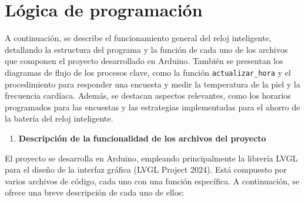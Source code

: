 \documentclass[
  12pt,
  letterpaper,
  DIV=11,
  numbers=noendperiod]{scrreport}
\providecommand{\tightlist}{%
  \setlength{\itemsep}{0pt}\setlength{\parskip}{0pt}}\usepackage{longtable,booktabs,array}
\begin{document}
\hypertarget{sec-programaciuxf3n}{%
\section{Lógica de programación}\label{sec-programaciuxf3n}}

A continuación, se describe el funcionamiento general del reloj
inteligente, detallando la estructura del programa y la función de cada
uno de los archivos que componen el proyecto desarrollado en Arduino.
También se presentan los diagramas de flujo de los procesos clave, como
la función \texttt{actualizar\_hora} y el procedimiento para responder
una encuesta y medir la temperatura de la piel y la frecuencia cardíaca.
Además, se destacan aspectos relevantes, como los horarios programados
para las encuestas y las estrategias implementadas para el ahorro de la
batería del reloj inteligente.

\begin{enumerate}
\def\labelenumi{\arabic{enumi}.}
\tightlist
\item
  \textbf{Descripción de la funcionalidad de los archivos del proyecto}
\end{enumerate}

El proyecto se desarrolla en Arduino, empleando principalmente la
librería LVGL para el diseño de la interfaz gráfica (LVGL Project 2024).
Está compuesto por varios archivos de código, cada uno con una función
específica. A continuación, se ofrece una breve descripción de cada uno
de ellos:
\end{document}
